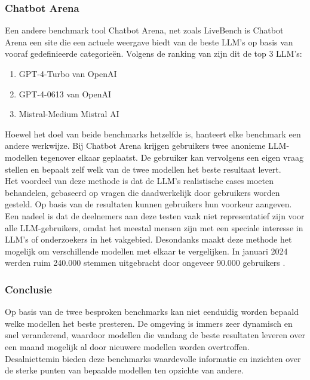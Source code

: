 \subsubsection{Chatbot Arena} 

Een andere benchmark tool Chatbot Arena, net zoals LiveBench is Chatbot Arena een site die een actuele weergave biedt van de beste LLM's op basis van vooraf gedefinieerde categorieën. 
Volgens de ranking van \textcite{chiang2024chatbotarenaopenplatform} zijn dit de top 3 LLM's:

\begin{enumerate}
    \item GPT-4-Turbo van OpenAI
    \item GPT-4-0613 van OpenAI
    \item Mistral-Medium Mistral AI
\end{enumerate}

Hoewel het doel van beide benchmarks hetzelfde is, hanteert elke benchmark een andere werkwijze. Bij Chatbot Arena krijgen gebruikers twee anonieme LLM-modellen tegenover elkaar geplaatst. De gebruiker kan vervolgens een eigen vraag stellen en bepaalt zelf welk van de twee modellen het beste resultaat levert.
\\[1em]
Het voordeel van deze methode is dat de LLM's realistische cases moeten behandelen, gebaseerd op vragen die daadwerkelijk door gebruikers worden gesteld. Op basis van de resultaten kunnen gebruikers hun voorkeur aangeven. Een nadeel is dat de deelnemers aan deze testen vaak niet representatief zijn voor alle LLM-gebruikers, omdat het meestal mensen zijn met een speciale interesse in LLM's of onderzoekers in het vakgebied. Desondanks maakt deze methode het mogelijk om verschillende modellen met elkaar te vergelijken. In januari 2024 werden ruim 240.000 stemmen uitgebracht door ongeveer 90.000 gebruikers \autocite{chiang2024chatbotarenaopenplatform}. 

\subsubsection{Conclusie}

Op basis van de twee besproken benchmarks kan niet eenduidig worden bepaald welke modellen het beste presteren. De omgeving is immers zeer dynamisch en snel veranderend, waardoor modellen die vandaag de beste resultaten leveren over een maand mogelijk al door nieuwere modellen worden overtroffen. Desalniettemin bieden deze benchmarks waardevolle informatie en inzichten over de sterke punten van bepaalde modellen ten opzichte van andere.

